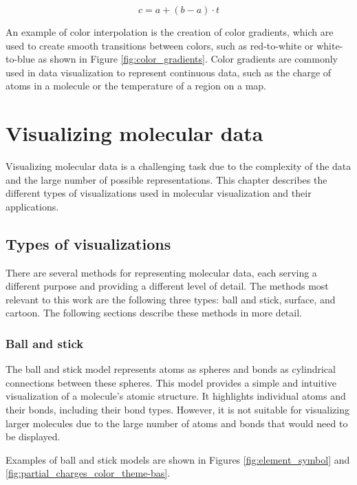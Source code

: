 \documentclass[
  digital,     %
  oneside,     %
  nosansbold,  %
  nocolorbold, %
  lof,         %
  lot,         %
]{fithesis4}
\begin{document}
\begin{equation}
  c = a + (b - a) \cdot t
  \label{eq:color_interpolation}
\end{equation}

An example of color interpolation is the creation of color gradients, which are used to create smooth transitions between colors, such as red-to-white or white-to-blue as shown in Figure \ref{fig:color_gradients}. Color gradients are commonly used in data visualization to represent continuous data, such as the charge of atoms in a molecule or the temperature of a region on a map.

\newpage
\chapter{Visualizing molecular data}
\label{chapter:visualizing_molecular_data}

Visualizing molecular data is a challenging task due to the complexity of the data and the large number of possible representations. This chapter describes the different types of visualizations used in molecular visualization and their applications.

\section{Types of visualizations}
\label{section:types_of_visualizations}

There are several methods for representing molecular data, each serving a different purpose and providing a different level of detail. The methods most relevant to this work are the following three types: ball and stick, surface, and cartoon. The following sections describe these methods in more detail.

\subsection{Ball and stick}
\label{subsection:ball_and_stick}

The ball and stick model represents atoms as spheres and bonds as cylindrical connections between these spheres. This model provides a simple and intuitive visualization of a molecule's atomic structure. It highlights individual atoms and their bonds, including their bond types. However, it is not suitable for visualizing larger molecules due to the large number of atoms and bonds that would need to be displayed.

Examples of ball and stick models are shown in Figures \ref{fig:element_symbol} and \ref{fig:partial_charges_color_theme-bas}.
\end{document}
